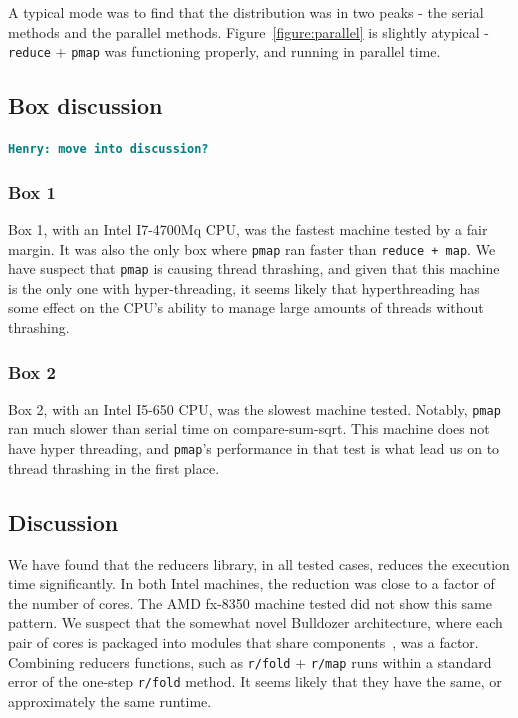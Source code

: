\documentclass[12pt]{article}
\newcommand{\comment}[1]{{\bf \tt  {#1}}}
\newcommand{\hfcomment}[1]{\textcolor{Teal}{\comment{Henry: {#1}}}}
\newcommand{\clocode}[1]{{\texttt {#1}}}
\begin{document}
A typical mode was to find that the distribution was in two peaks - the serial methods and the parallel methods. Figure~\ref{figure:parallel} is slightly atypical - \clocode{reduce} + \clocode{pmap} was functioning properly, and running in parallel time.

\subsection{Box discussion}\label{sec:boxdiscussion}

\hfcomment{move into discussion?}
\subsubsection{Box 1}

Box 1, with an Intel I7-4700Mq CPU, was the fastest machine tested by a fair margin. It was also the only box where \clocode{pmap} ran faster than \clocode{reduce + map}. We have suspect that \clocode{pmap} is causing thread thrashing, and given that this machine is the only one with hyper-threading, it seems likely that hyperthreading has some effect on the CPU's ability to manage large amounts of threads without thrashing.

\subsubsection{Box 2}

Box 2, with an Intel I5-650 CPU, was the slowest machine tested. Notably, \clocode{pmap} ran much slower than serial time on compare-sum-sqrt. This machine does not have hyper threading, and \clocode{pmap}'s performance in that test is what lead us on to thread thrashing in the first place.

\subsection{Discussion}\label{sec:discussion}

We have found that the reducers library, in all tested cases, reduces the execution time significantly. In both Intel machines, the reduction was close to a factor of the number of cores. The AMD fx-8350 machine tested did not show this same pattern. We suspect that the somewhat novel Bulldozer architecture, where each pair of cores is packaged into modules that share components~\cite{McIntyre:2012},  was a factor. Combining reducers functions, such as \clocode{r/fold} + \clocode{r/map} runs within a standard error of the one-step \clocode{r/fold} method. It seems likely that they have the same, or approximately the same runtime.
\end{document}
